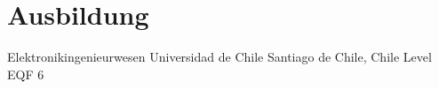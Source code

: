 \section{Ausbildung}
            {Elektronikingenieurwesen}
            {Universidad de Chile}
            {Santiago de Chile, Chile}
            {Level EQF 6}
            {}